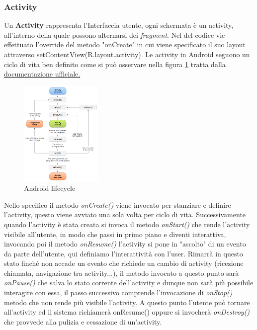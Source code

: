     \subsubsection{Activity} Un \textbf{Activity} rappresenta l'Interfaccia utente, ogni schermata è un activity, all'interno della quale possono alternarsi dei \textit{fragment}. Nel del codice vie effettuato l'override del metodo "onCreate" in cui viene specificato il suo layout attraverso setContentView(R.layout.activity). Le activity in Android seguono un ciclo di vita ben definito come si può osservare nella figura \ref{fig:lifecicle} tratta dalla \href{https://developer.android.com/guide/components/activities/activity-lifecycle}{documentazione ufficiale.}
        \begin{figure}[h]
        \centering
        \includegraphics[width=0.35\textwidth]{imgs/capitolo2/Applicazioni/activity_lifecycle.png}
        \caption{Android lifecycle}
        \label{fig:lifecicle}
        \end{figure}
        \FloatBarrier %
    Nello specifico il metodo \textit{onCreate()} viene invocato per stanziare e definire l'activity, questo viene avviato una sola volta per ciclo di vita. Successivamente quando l'activity è stata creata si invoca il metodo \textit{onStart()} che rende l'activity visibile all'utente, in modo che passi in primo piano e diventi interattiva, invocando poi il metodo \textit{onResume()} l'activity si pone in "ascolto" di un evento da parte dell'utente, qui definiamo l'interattività con l'user. Rimarrà in questo stato finché non accade un evento che richiede un cambio di activity (ricezione chiamata, navigazione tra activity...), il metodo invocato a questo punto sarà \textit{onPause()} che salva lo stato corrente dell'activity e dunque non sarà più possibile interagire con essa, il passo successivo comprende l'invocazione di \textit{onStop()} metodo che non rende più visibile l'activity. A questo punto l'utente può tornare all'activity ed il sistema richiamerà onResume() oppure si invocherà \textit{onDestroy()} che provvede alla pulizia e cessazione di un'activity. 

